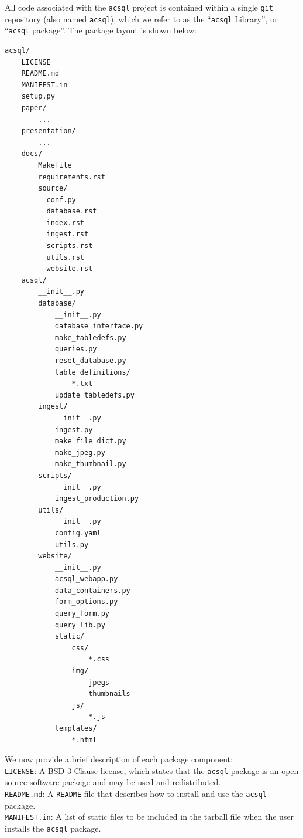 \documentclass[10pt,journal,compsoc]{IEEEtran}
\begin{document}
All code associated with the \texttt{acsql} project is contained within a single \texttt{git} repository
(also named \texttt{acsql}), which we refer to as the ``\texttt{acsql} Library'', or ``\texttt{acsql} package''.
The package layout is shown below:

\lstset{basicstyle=\footnotesize\ttfamily,breaklines=true}
\begin{lstlisting}
acsql/
    LICENSE
    README.md
    MANIFEST.in
    setup.py
    paper/
        ...
    presentation/
        ...
    docs/
        Makefile
        requirements.rst
        source/
          conf.py
          database.rst
          index.rst
          ingest.rst
          scripts.rst
          utils.rst
          website.rst
    acsql/
        __init__.py
        database/
            __init__.py
            database_interface.py
            make_tabledefs.py
            queries.py
            reset_database.py
            table_definitions/
                *.txt
            update_tabledefs.py
        ingest/
            __init__.py
            ingest.py
            make_file_dict.py
            make_jpeg.py
            make_thumbnail.py
        scripts/
            __init__.py
            ingest_production.py
        utils/
            __init__.py
            config.yaml
            utils.py
        website/
            __init__.py
            acsql_webapp.py
            data_containers.py
            form_options.py
            query_form.py
            query_lib.py
            static/
                css/
                    *.css
                img/
                    jpegs
                    thumbnails
                js/
                    *.js
            templates/
                *.html
\end{lstlisting}

We now provide a brief description of each package component:\\

\noindent\texttt{LICENSE}: A BSD 3-Clause license, which states that the \texttt{acsql} package is an open source software package
and may be used and redistributed.\\

\noindent\texttt{README.md}: A \texttt{README} file that describes how to install and use the \texttt{acsql} package.\\

\noindent\texttt{MANIFEST.in}: A list of static files to be included in the tarball file when the user installs the
\noindent\texttt{acsql} package.\\
\end{document}
